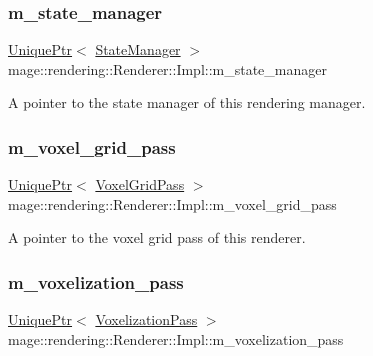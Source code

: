 \subsubsection{\texorpdfstring{m\+\_\+state\+\_\+manager}{m\_state\_manager}}
{\footnotesize\ttfamily \hyperlink{namespacemage_a3316d7143a973e37adf1110f2e80ca31}{Unique\+Ptr}$<$ \hyperlink{classmage_1_1rendering_1_1_state_manager}{State\+Manager} $>$ mage\+::rendering\+::\+Renderer\+::\+Impl\+::m\+\_\+state\+\_\+manager\hspace{0.3cm}{\ttfamily [private]}}

A pointer to the state manager of this rendering manager. \hypertarget{classmage_1_1rendering_1_1_renderer_1_1_impl_ad0b4ff740d36e1723949213ab5ba74bc}{}\label{classmage_1_1rendering_1_1_renderer_1_1_impl_ad0b4ff740d36e1723949213ab5ba74bc} 
\subsubsection{\texorpdfstring{m\+\_\+voxel\+\_\+grid\+\_\+pass}{m\_voxel\_grid\_pass}}
{\footnotesize\ttfamily \hyperlink{namespacemage_a3316d7143a973e37adf1110f2e80ca31}{Unique\+Ptr}$<$ \hyperlink{classmage_1_1rendering_1_1_voxel_grid_pass}{Voxel\+Grid\+Pass} $>$ mage\+::rendering\+::\+Renderer\+::\+Impl\+::m\+\_\+voxel\+\_\+grid\+\_\+pass\hspace{0.3cm}{\ttfamily [private]}}

A pointer to the voxel grid pass of this renderer. \hypertarget{classmage_1_1rendering_1_1_renderer_1_1_impl_a1701b11fe9fe100a033920b6e8617adb}{}\label{classmage_1_1rendering_1_1_renderer_1_1_impl_a1701b11fe9fe100a033920b6e8617adb} 
\subsubsection{\texorpdfstring{m\+\_\+voxelization\+\_\+pass}{m\_voxelization\_pass}}
{\footnotesize\ttfamily \hyperlink{namespacemage_a3316d7143a973e37adf1110f2e80ca31}{Unique\+Ptr}$<$ \hyperlink{classmage_1_1rendering_1_1_voxelization_pass}{Voxelization\+Pass} $>$ mage\+::rendering\+::\+Renderer\+::\+Impl\+::m\+\_\+voxelization\+\_\+pass\hspace{0.3cm}{\ttfamily [private]}}

